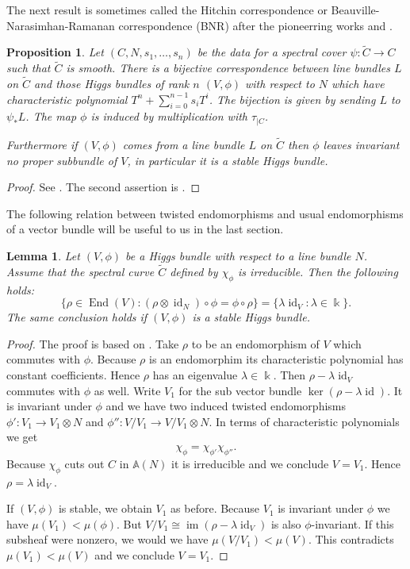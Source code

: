 \documentclass[12pt]{extarticle}
\newtheorem{proposition}[theorem]{Proposition}
\newtheorem{lemma}[theorem]{Lemma}
\theoremstyle{definition}
\numberwithin{theorem}{section}
\newcommand{\Aff}{\mathbb{A}}
\newcommand{\op}{\operatorname}
\renewcommand{\tilde}{\widetilde}		%
\begin{document}
The next result is sometimes called the Hitchin correspondence or Beauville- Narasimhan-Ramanan correspondence (BNR) after the pioneerring works \cite{Hitchin} and \cite{BNR}. 
\begin{proposition}\label{prop:hitchin_corr}
Let $(C,N,s_1,\ldots,s_n)$ be the data for a spectral cover $\psi: \tilde{C} \to C$ such that $\tilde{C}$ is smooth. There is a bijective correspondence between line bundles $L$ on $\tilde{C}$ and those Higgs bundles of rank $n$ $(V,\phi)$ with respect to $N$ which have characteristic polynomial $T^n + \sum_{i=0}^{n-1}s_iT^i$. The bijection is given by sending $L$ to $\psi_*L$. The map $\phi$ is induced by multiplication with $\tau_{|C}$.

Furthermore if $(V,\phi)$ comes from a line bundle $L$ on $\tilde{C}$ then $\phi$ leaves invariant no proper subbundle of $V$, in particular it is a stable Higgs bundle. 
\end{proposition}
\begin{proof}
See \cite[Proposition 3.6]{BNR}. The second assertion is \cite[Lemma 5.1]{NagarajRamanan}.
\end{proof}
The following relation between twisted endomorphisms and usual endomorphisms of a vector bundle will be useful to us in the last section.
\begin{lemma}\label{lemma:aut}
Let $(V,\phi)$ be a Higgs bundle with respect to a line bundle $N$. Assume that the spectral curve $\tilde{C}$ defined by $\chi_\phi$ is irreducible. Then the following holds: \begin{equation*}
\{ \rho \in \op{End}(V) : (\rho \otimes \op{id}_N)\circ\phi = \phi \circ \rho \} = \{ \lambda  \op{id}_V : \lambda \in \Bbbk\}.
\end{equation*}
The same conclusion holds if $(V,\phi)$ is a stable Higgs bundle.  
\end{lemma}
\begin{proof}
The proof is based on \cite[Lemma 5.2]{NagarajRamanan}. Take $\rho$ to be an endomorphism of $V$ which commutes with $\phi$. Because $\rho$ is an endomorphim its  characteristic polynomial has constant coefficients. Hence $\rho$ has an eigenvalue $\lambda \in \Bbbk$. Then $\rho - \lambda\op{id}_V$ commutes with $\phi$ as well. Write $V_1$  for the sub vector bundle $\op{ker}(\rho - \lambda\op{id})$. It is invariant under $\phi$ and we have two induced twisted endomorphisms $\phi': V_1 \rightarrow V_1 \otimes N$ and $\phi'': V/V_1 \rightarrow V/V_1 \otimes N$. In terms of characteristic polynomials we get
\begin{equation*}
\chi_\phi = \chi_{\phi'}\chi_{\phi''}.
\end{equation*}
Because $\chi_\phi$ cuts out $C$ in $\Aff(N)$ it is irreducible and we conclude $V = V_1$. Hence $\rho = \lambda\op{id}_V$.

If $(V,\phi)$ is stable, we obtain $V_1$ as before. Because $V_1$ is invariant under $\phi$ we have $\mu(V_1) < \mu(\phi)$. But $V/V_1 \cong \op{im}(\rho-\lambda \op{id}_V)$ is also $\phi$-invariant. If this subsheaf were nonzero, we would we have $\mu(V/V_1) < \mu(V)$. This contradicts $\mu(V_1) < \mu(V)$ and we conclude $V = V_1$. 
\end{proof}
\end{document}

